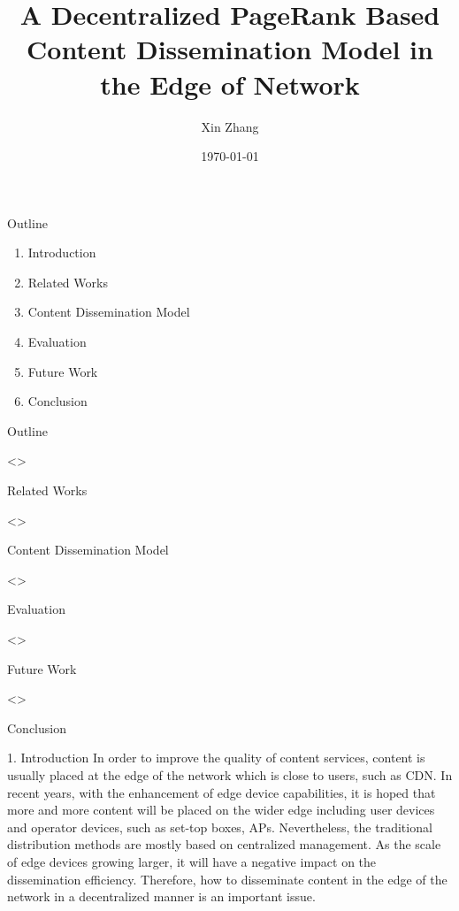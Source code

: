 \documentclass{beamer}		%
\date{}	%
\title[]{A Decentralized PageRank Based\\Content Dissemination Model in the Edge of Network}	%
\author[Xin Zhang]{Xin Zhang} %
\institute[UCAS]{UCAS} %
\date{\today}
\begin{document}


\begin{frame}	
\titlepage	%
\end{frame}		

\begin{frame}{Outline}
\begin{enumerate}[1. ]
    \item Introduction
    \item Related Works
    \item Content Dissemination Model
    \item Evaluation
    \item Future Work
    \item Conclusion
\end{enumerate}
\end{frame}



\begin{frame}{Outline}
\begin{enumerate}[1. ]
    \uncover<>{\item Related Works}
    \uncover<>{\item Content Dissemination Model}
    \uncover<>{\item Evaluation}
    \uncover<>{\item Future Work}
    \uncover<>{\item Conclusion}
\end{enumerate}
\end{frame}

\begin{frame}{1. Introduction}
In order to improve the quality of content services, content is usually placed at the edge of the network which is close to users, such as CDN. In recent years, with the enhancement of edge device capabilities, it is hoped that more and more content will be placed on the wider edge including user devices and operator devices, such as set-top boxes, APs. Nevertheless, the traditional distribution methods are mostly based on centralized management. As the scale of edge devices growing larger, it will have a negative impact on the dissemination efficiency. Therefore, how to disseminate content in the edge of the network in a decentralized manner is an important issue.
\end{frame}
\end{document}
